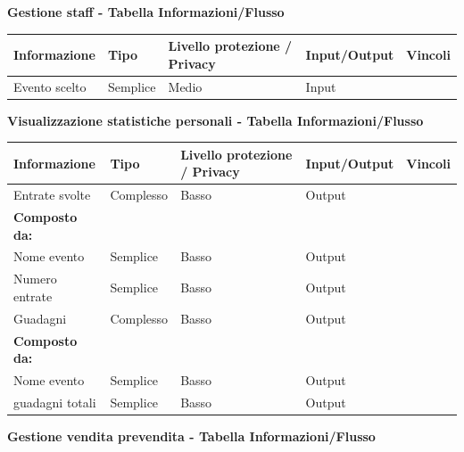 \documentclass[a4paper]{article}
\begin{document}
\textbf{Gestione staff  - Tabella Informazioni/Flusso}

\begin{center}
    \begin{tabularx}{1\textwidth}{|X|X|X|X|X|}
        \hline
        \textbf{Informazione} &\textbf{Tipo} & \textbf{Livello protezione / Privacy} & \textbf{Input/Output} & \textbf{Vincoli}\\
        \hline
        \hline
        Evento scelto & Semplice & Medio & Input & \\
        \hline
    \end{tabularx}
\end{center}

\textbf{Visualizzazione statistiche personali  - Tabella Informazioni/Flusso}

\begin{center}
    \begin{tabularx}{1\textwidth}{|X|X|X|X|X|}
        \hline
        \textbf{Informazione} &\textbf{Tipo} & \textbf{Livello protezione / Privacy} & \textbf{Input/Output} & \textbf{Vincoli}\\
        \hline
        \hline
        Entrate svolte & Complesso & Basso & Output & \\
        \textbf{Composto da:} & & & & \\
        Nome evento & Semplice & Basso & Output & \\
        Numero entrate & Semplice & Basso & Output & \\
        \hline
        Guadagni & Complesso & Basso & Output & \\
        \textbf{Composto da:} & & & & \\
        Nome evento & Semplice & Basso & Output & \\
        guadagni totali & Semplice & Basso & Output & \\
        \hline
    \end{tabularx}
\end{center}

\textbf{Gestione vendita prevendita  - Tabella Informazioni/Flusso}
\end{document}
